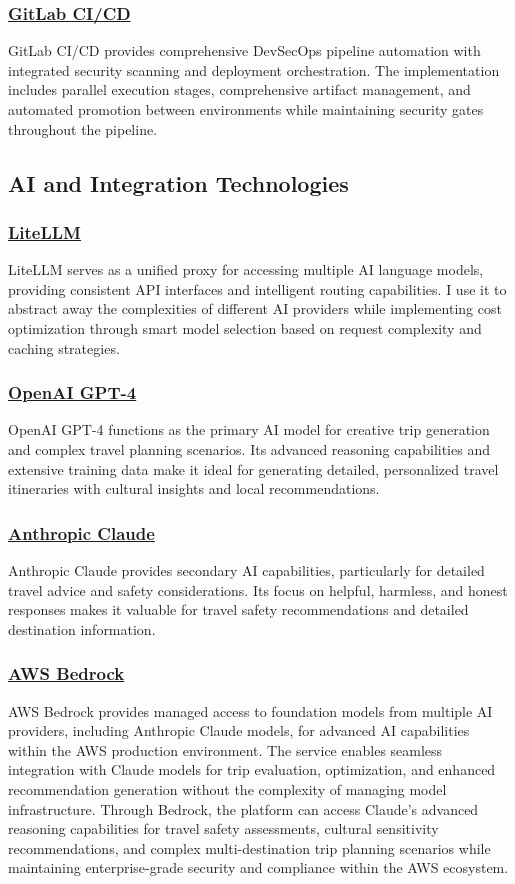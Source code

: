 \subsubsection*{\underline{GitLab CI/CD}}
GitLab CI/CD provides comprehensive DevSecOps pipeline automation with integrated security scanning and deployment orchestration. The implementation includes parallel execution stages, comprehensive artifact management, and automated promotion between environments while maintaining security gates throughout the pipeline.

\subsection{AI and Integration Technologies}

\subsubsection*{\underline{LiteLLM}}
LiteLLM serves as a unified proxy for accessing multiple AI language models, providing consistent API interfaces and intelligent routing capabilities. I use it to abstract away the complexities of different AI providers while implementing cost optimization through smart model selection based on request complexity and caching strategies.

\subsubsection*{\underline{OpenAI GPT-4}}
OpenAI GPT-4 functions as the primary AI model for creative trip generation and complex travel planning scenarios. Its advanced reasoning capabilities and extensive training data make it ideal for generating detailed, personalized travel itineraries with cultural insights and local recommendations.

\subsubsection*{\underline{Anthropic Claude}}
Anthropic Claude provides secondary AI capabilities, particularly for detailed travel advice and safety considerations. Its focus on helpful, harmless, and honest responses makes it valuable for travel safety recommendations and detailed destination information.

\subsubsection*{\underline{AWS Bedrock}}
AWS Bedrock provides managed access to foundation models from multiple AI providers, including Anthropic Claude models, for advanced AI capabilities within the AWS production environment. The service enables seamless integration with Claude models for trip evaluation, optimization, and enhanced recommendation generation without the complexity of managing model infrastructure. Through Bedrock, the platform can access Claude's advanced reasoning capabilities for travel safety assessments, cultural sensitivity recommendations, and complex multi-destination trip planning scenarios while maintaining enterprise-grade security and compliance within the AWS ecosystem.

